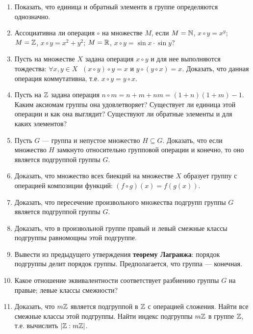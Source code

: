 \begin{enumerate}
\item Показать, что единица и обратный элементв в группе определяются однозначно.

\item Ассоциативна ли операция $\circ$ на множестве $M$, если 
\ipunkt $M = \mathbb N$, $x\circ y = x^y$;
\ipunkt $M = \mathbb Z$, $x\circ y = x^2 + y^2$;
\ipunkt $M = \mathbb R$, $x\circ y = \sin x \cdot \sin y$?

\item Пусть на множестве $X$ задана операция $x\circ y$ и для нее выполняются тождества: $\forall x,y\in X\;$ $(x\circ y)\circ y=x$ и $y\circ(y\circ x)=x$. Доказать, что данная операция коммутативна, т.е. $x\circ y=y\circ x$.

\item Пусть на $\mathbb Z$ задана операция $n\circ m = n+m+nm=(1+n)(1+m)-1$. Каким аксиомам группы она удовлетворяет? Существует ли единица этой операции и как она выглядит? Существуют ли обратные элементы и для каких элементов?

\item Пусть $G$ --- группа и непустое множество $H\subseteq G$. Доказать, что если множество $H$ замкнуто относительно групповой операции и конечно, то оно является подгруппой группы $G$.

\item Доказать, что множество всех биекций на множестве $X$ образует группу с операцией композиции функций: $(f\circ g)(x)=f(g(x))$.

\item Доказать, что пересечение произвольного множества подгрупп группы $G$ является подгруппой группы $G$.

\item Доказать, что в произвольной группе правый и левый смежные классы подгруппы равномощны этой подгруппе.

\item Вывести из предыдущего утверждения \textbf{теорему Лагранжа}: порядок подгруппы делит порядок группы. Предполагается, что группа --- конечная.

\item Какое отношение эквивалентности соответствует разбиению группы $G$ на \ipunkt правые; \ipunkt левые классы смежности?

\item Доказать, что $m\mathbb Z$ является подгруппой в $\mathbb Z$ с операцией сложения. Найти все смежные классы этой подгруппы. Найти индекс подгруппы $m\mathbb Z$ в группе $\mathbb Z$, т.е. вычислить $|\mathbb Z:m\mathbb Z|$.


\end{enumerate}
